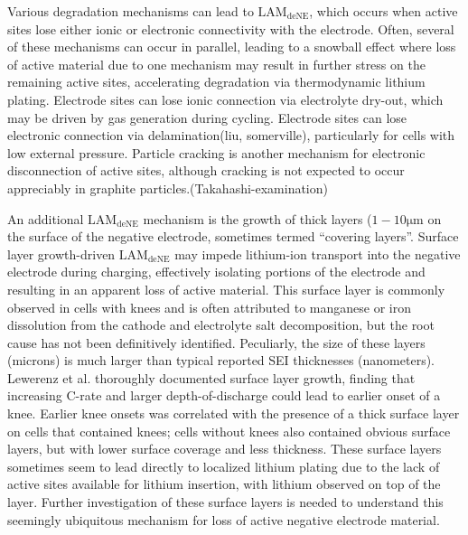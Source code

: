 \documentclass[journal=jpcl, manuscript=article, layout=onecolumn]{achemso}
\begin{document}
Various degradation mechanisms can lead to $\mathrm{LAM_{deNE}}$, which occurs when active sites lose either ionic or electronic connectivity with the electrode.
Often, several of these mechanisms can occur in parallel, leading to a snowball effect where loss of active material due to one mechanism may result in further stress on the remaining active sites, accelerating degradation via thermodynamic lithium plating.
Electrode sites can lose ionic connection via electrolyte dry-out, which may be driven by gas generation during cycling.\cite{mao_calendar_2017, kupper_end--life_2018}
Electrode sites can lose electronic connection via delamination\cite{cannarella_stress_2014, willenberg_high-precision_2020}(liu, somerville), particularly for cells with low external pressure\cite{cannarella_stress_2014}. Particle cracking is another mechanism for electronic disconnection of active sites, although cracking is not expected to occur appreciably in graphite particles.(Takahashi-examination)

An additional $\mathrm{LAM_{deNE}}$ mechanism is the growth of thick layers ($1-10 \mathrm{\mu m}$ on the surface of the negative electrode, sometimes termed ``covering layers''\cite{lewerenz_post-mortem_2017, lewerenz_systematic_2017, willenberg_development_2020}.
Surface layer growth-driven $\mathrm{LAM_{deNE}}$ may impede lithium-ion transport into the negative electrode during charging, effectively isolating portions of the electrode and resulting in an apparent loss of active material. This surface layer is commonly observed in cells with knees and is often attributed to manganese or iron dissolution from the cathode and electrolyte salt decomposition, \cite{lewerenz_post-mortem_2017,lewerenz_systematic_2017,zhu_investigation_2021,stiaszny_electrochemical_2014,rahe_nanoscale_2019,keil_linear_2019,sarasketa-zabala_understanding_2015, willenberg_high-precision_2020} but the root cause has not been definitively identified. Peculiarly, the size of these layers (microns) is much larger than typical reported SEI thicknesses (nanometers)\cite{peled_reviewsei_2017}. Lewerenz et al.\cite{lewerenz_post-mortem_2017,lewerenz_systematic_2017} thoroughly documented surface layer growth, finding that increasing C-rate and larger depth-of-discharge could lead to earlier onset of a knee. Earlier knee onsets was correlated with the presence of a thick surface layer on cells that contained knees; cells without knees also contained obvious surface layers, but with lower surface coverage and less thickness. These surface layers sometimes seem to lead directly to localized lithium plating due to the lack of active sites available for lithium insertion, with lithium observed on top of the layer.\cite{zhu_investigation_2021}
Further investigation of these surface layers is needed to understand this seemingly ubiquitous mechanism for loss of active negative electrode material.
\end{document}
